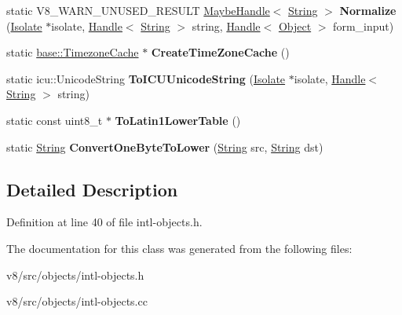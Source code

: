 \begin{DoxyCompactItemize}
static V8\+\_\+\+W\+A\+R\+N\+\_\+\+U\+N\+U\+S\+E\+D\+\_\+\+R\+E\+S\+U\+LT \mbox{\hyperlink{classv8_1_1internal_1_1MaybeHandle}{Maybe\+Handle}}$<$ \mbox{\hyperlink{classv8_1_1internal_1_1String}{String}} $>$ {\bfseries Normalize} (\mbox{\hyperlink{classv8_1_1internal_1_1Isolate}{Isolate}} $\ast$isolate, \mbox{\hyperlink{classv8_1_1internal_1_1Handle}{Handle}}$<$ \mbox{\hyperlink{classv8_1_1internal_1_1String}{String}} $>$ string, \mbox{\hyperlink{classv8_1_1internal_1_1Handle}{Handle}}$<$ \mbox{\hyperlink{classv8_1_1internal_1_1Object}{Object}} $>$ form\+\_\+input)
\item 
\mbox{\label{classv8_1_1internal_1_1Intl_a1060302fe4f7f80ba2d122324a5a7e21}} 
static \mbox{\hyperlink{classv8_1_1base_1_1TimezoneCache}{base\+::\+Timezone\+Cache}} $\ast$ {\bfseries Create\+Time\+Zone\+Cache} ()
\item 
\mbox{\label{classv8_1_1internal_1_1Intl_a30c348537f8cd896db7084002a4b92a8}} 
static icu\+::\+Unicode\+String {\bfseries To\+I\+C\+U\+Unicode\+String} (\mbox{\hyperlink{classv8_1_1internal_1_1Isolate}{Isolate}} $\ast$isolate, \mbox{\hyperlink{classv8_1_1internal_1_1Handle}{Handle}}$<$ \mbox{\hyperlink{classv8_1_1internal_1_1String}{String}} $>$ string)
\item 
\mbox{\label{classv8_1_1internal_1_1Intl_a6e8294d5bff6085431c7c09a9bfc66dc}} 
static const uint8\+\_\+t $\ast$ {\bfseries To\+Latin1\+Lower\+Table} ()
\item 
\mbox{\label{classv8_1_1internal_1_1Intl_a60590ebd560634485c456c11d09f2498}} 
static \mbox{\hyperlink{classv8_1_1internal_1_1String}{String}} {\bfseries Convert\+One\+Byte\+To\+Lower} (\mbox{\hyperlink{classv8_1_1internal_1_1String}{String}} src, \mbox{\hyperlink{classv8_1_1internal_1_1String}{String}} dst)
\end{DoxyCompactItemize}


\subsection{Detailed Description}


Definition at line 40 of file intl-\/objects.\+h.



The documentation for this class was generated from the following files\+:\begin{DoxyCompactItemize}
\item 
v8/src/objects/intl-\/objects.\+h\item 
v8/src/objects/intl-\/objects.\+cc\end{DoxyCompactItemize}
